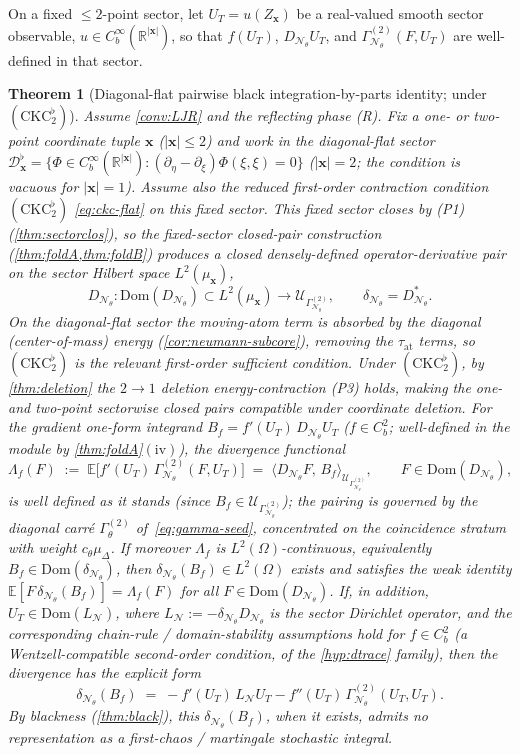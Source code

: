 \documentclass[reqno,final,11pt]{amsart}
\theoremstyle{plain}
\newtheorem{theorem}{Theorem}[section]
\theoremstyle{definition}
\theoremstyle{remark}
\newcommand{\R}{\mathbb R}
\newcommand{\E}{\mathbb E}
\newcommand{\Dom}{\mathrm{Dom}}
\newcommand{\cD}{\mathcal D}
\newcommand{\cN}{\mathcal N}
\newcommand{\cU}{\mathcal U}
\newcommand{\GamT}{\Gamma^{(2)}_{\theta}}
\newcommand{\GamN}{\Gamma^{(2)}_{\cN_\theta}}
\newcommand{\DN}{D_{\cN_\theta}}
\newcommand{\divN}{\delta_{\cN_\theta}}
\newcommand{\muD}{\mu_{\Delta}}
\newcommand{\cth}{c_{\theta}}
\begin{document}
On a fixed $\le2$-point sector, let $U_T=u(Z_{\mathbf x})$ be a real-valued smooth
sector observable, $u\in C_b^\infty(\R^{|\mathbf x|})$, so that $f(U_T)$,
$\DN U_T$, and $\GamN(F,U_T)$ are well-defined in that sector.

\begin{theorem}[Diagonal-flat pairwise black integration-by-parts identity; under $(\mathrm{CKC}_2^{\flat})$]\label{thm:pairwise-ito}
Assume \cref{conv:LJR} and the reflecting phase \textnormal{(R)}. Fix a one- or
two-point coordinate tuple $\mathbf x$ ($|\mathbf x|\le2$) and work in the
diagonal-flat sector
$\cD^{\flat}_{\mathbf x}=\{\Phi\in C_b^\infty(\R^{|\mathbf x|}):(\partial_\eta-\partial_\xi)\Phi(\xi,\xi)=0\}$
($|\mathbf x|=2$; the condition is vacuous for $|\mathbf x|=1$). Assume also the
reduced first-order contraction condition $(\mathrm{CKC}_2^{\flat})$
\eqref{eq:ckc-flat} on this fixed sector. This fixed sector
closes by \textnormal{(P1)} (\cref{thm:sectorclos}), so the fixed-sector
closed-pair construction (\cref{thm:foldA,thm:foldB}) produces a closed
densely-defined operator-derivative pair on the sector Hilbert space
$L^2(\mu_{\mathbf x})$,
\[
  \DN\colon\Dom(\DN)\subset L^2(\mu_{\mathbf x})\to\cU_{\GamN},
  \qquad \divN=\DN^{*}.
\]
On the diagonal-flat sector the moving-atom term is absorbed by the diagonal
(center-of-mass) energy (\cref{cor:neumann-subcore}), removing the
$\tau_{\mathrm{at}}$ terms, so $(\mathrm{CKC}_2^{\flat})$ is the relevant
first-order sufficient condition.
Under $(\mathrm{CKC}_2^{\flat})$, by \cref{thm:deletion} the
$2\to1$ deletion energy-contraction \textnormal{(P3)} holds, making the one- and
two-point sectorwise closed pairs compatible under coordinate deletion.
For the gradient one-form integrand $B_f=f'(U_T)\,\DN U_T$ ($f\in C_b^2$;
well-defined in the module by \cref{thm:foldA}$(\mathrm{iv})$), the
divergence functional
\begin{equation}\label{eq:black-ibp}
  \Lambda_f(F)\;:=\;\E\bigl[f'(U_T)\,\GamN(F,U_T)\bigr]
  \;=\;\langle\DN F,\,B_f\rangle_{\cU_{\GamN}},
  \qquad F\in\Dom(\DN),
\end{equation}
is well defined as it stands (since $B_f\in\cU_{\GamN}$); the pairing is
governed by the diagonal carr\'e $\GamT$ of~\eqref{eq:gamma-seed}, concentrated on
the coincidence stratum with weight $\cth\muD$. If moreover $\Lambda_f$ is
$L^2(\Omega)$-continuous, equivalently $B_f\in\Dom(\divN)$, then
$\divN(B_f)\in L^2(\Omega)$ exists and satisfies the weak identity
$\E[F\,\divN(B_f)]=\Lambda_f(F)$ for all $F\in\Dom(\DN)$. If, in addition,
$U_T\in\Dom(L_{\cN})$, where $L_{\cN}:=-\divN\DN$ is the sector Dirichlet
operator, and the corresponding chain-rule / domain-stability
assumptions hold for $f\in C_b^2$ (a Wentzell-compatible second-order condition,
of the \cref{hyp:dtrace} family), then the divergence has the explicit form
\[
  \divN(B_f)\;=\;-f'(U_T)\,L_{\cN}U_T-f''(U_T)\,\GamN(U_T,U_T).
\]
By blackness (\cref{thm:black}), this $\divN(B_f)$, when it exists, admits
no representation as a first-chaos / martingale stochastic integral.
\end{theorem}
\end{document}
